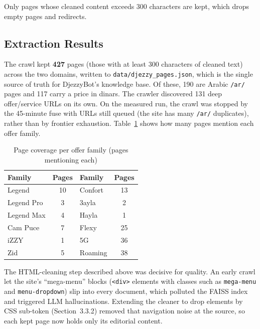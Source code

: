 \documentclass[12pt, a4paper]{report}
\newcommand{\humantext}[1]{#1}      %
\newcommand{\numPages}{427}\newcommand{\numArPages}{190}\newcommand{\numPricedPages}{117}
\begin{document}
\humantext{Only pages whose cleaned content exceeds 300 characters are kept, which drops empty pages and redirects.}

\subsection{Extraction Results}
\humantext{The crawl kept \textbf{\numPages{}} pages (those with at least 300 characters of cleaned text) across the two domains, written to \texttt{data/djezzy\_pages.json}, which is the single source of truth for DjezzyBot's knowledge base. Of these, \numArPages{} are Arabic \texttt{/ar/} pages and \numPricedPages{} carry a price in dinars. The crawler discovered 131 deep offer/service URLs on its own. On the measured run, the crawl was stopped by the 45-minute fuse with URLs still queued (the site has many \texttt{/ar/} duplicates), rather than by frontier exhaustion. Table~\ref{tab:scraped_data} shows how many pages mention each offer family.}

\begin{table}[H]
\centering
\caption{Page coverage per offer family (pages mentioning each)}
\label{tab:scraped_data}
\begin{tabularx}{\textwidth}{X c X c}
\toprule
\textbf{Family} & \textbf{Pages} & \textbf{Family} & \textbf{Pages} \\
\midrule
Legend      & 10 & Confort  & 13 \\
Legend Pro  & 3  & 3ayla    & 2  \\
Legend Max  & 4  & Hayla    & 1  \\
Cam Puce    & 7  & Flexy    & 25 \\
iZZY        & 1  & 5G       & 36 \\
Zid         & 5  & Roaming  & 38 \\
\bottomrule
\end{tabularx}
\end{table}

\humantext{The HTML-cleaning step described above was decisive for quality. An early crawl let the site's ``mega-menu'' blocks (\texttt{<div>} elements with classes such as \texttt{mega-menu} and \texttt{menu-dropdown}) slip into every document, which polluted the FAISS index and triggered LLM hallucinations. Extending the cleaner to drop elements by CSS sub-token (Section~3.3.2) removed that navigation noise at the source, so each kept page now holds only its editorial content.}
\end{document}
